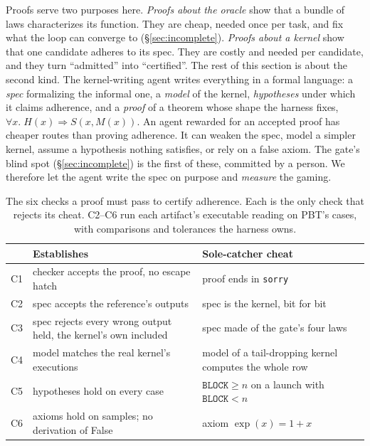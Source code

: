 Proofs serve two purposes here. \emph{Proofs about the oracle} show that a bundle of laws
characterizes its function. They are cheap, needed once per task, and fix what the loop
can converge to (\S\ref{sec:incomplete}). \emph{Proofs about a kernel} show that one
candidate adheres to its spec. They are costly and needed per candidate, and they turn
``admitted'' into ``certified''. The rest of this section is about the second kind. The
kernel-writing agent writes everything
in a formal language: a \emph{spec} formalizing the informal one, a \emph{model} of the
kernel, \emph{hypotheses} under which it claims adherence, and a \emph{proof} of a
theorem whose shape the harness fixes, $\forall x.\; H(x) \Rightarrow S(x, M(x))$. An
agent rewarded for an accepted proof has cheaper routes than proving adherence. It can
weaken the spec, model a simpler kernel, assume a hypothesis nothing satisfies, or
rely on a false axiom. The gate's blind spot (\S\ref{sec:incomplete}) is the first of
these, committed by a person. We therefore let the agent write the spec on purpose and
\emph{measure} the gaming.

\begin{table}[t]
\centering
\small
\setlength{\tabcolsep}{3pt}
\begin{tabular}{@{}lp{}p{}@{}}
\toprule
& Establishes & Sole-catcher cheat \\
\midrule
C1 & checker accepts the proof, no escape hatch & proof ends in \texttt{sorry} \\
C2 & spec accepts the reference's outputs & spec is the kernel, bit for bit \\
C3 & spec rejects every wrong output held, the kernel's own included & spec made of the gate's four laws \\
C4 & model matches the real kernel's executions & model of a tail-dropping kernel computes the whole row \\
C5 & hypotheses hold on every case & $\texttt{BLOCK} \ge n$ on a launch with $\texttt{BLOCK} < n$ \\
C6 & axioms hold on samples; no derivation of \textsf{False} & axiom $\exp(x) = 1 + x$ \\
\bottomrule
\end{tabular}
\caption{The six checks a proof must pass to certify adherence. Each is the only check
  that rejects its cheat. C2--C6 run each artifact's executable reading on PBT's
  cases, with comparisons and tolerances the harness owns.}
\label{tab:checks}
\end{table}

